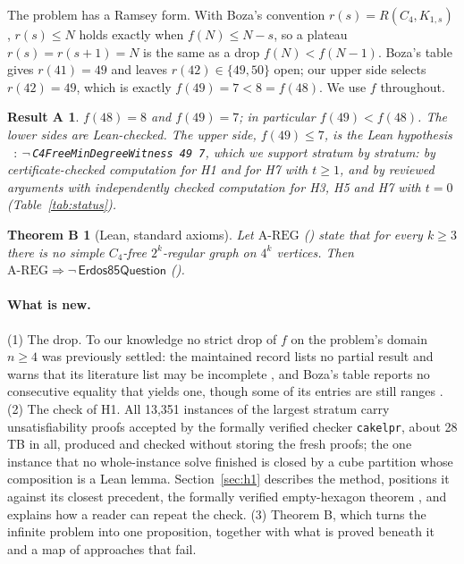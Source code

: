 \documentclass{anvil-paper}
\newcommand{\AREG}{\mathrm{A\text{-}REG}}
\newcommand{\Qn}{\textsf{Erdos85Question}}
\newcommand{\hnoFortyNine}{\lean{hno49}}
\newcommand{\cakelpr}{\texttt{cake\textunderscore lpr}}
\newtheorem*{resultA}{Result A}
\newtheorem*{theoremB}{Theorem B}
\theoremstyle{definition}
\begin{document}
The problem has a Ramsey form. With Boza's convention $r(s)=R(C_4,K_{1,s})$ \citep{boza2024ramsey,zhang2017polarity}, $r(s)\le N$ holds exactly when $f(N)\le N-s$, so a plateau $r(s)=r(s+1)=N$ is the same as a drop $f(N)<f(N-1)$. Boza's table gives $r(41)=49$ and leaves $r(42)\in\{49,50\}$ open; our upper side selects $r(42)=49$, which is exactly $f(49)=7<8=f(48)$. We use $f$ throughout.

\begin{resultA}
$f(48)=8$ and $f(49)=7$; in particular $f(49)<f(48)$. The lower sides are Lean-checked. The upper side, $f(49)\le 7$, is the Lean hypothesis \hnoFortyNine\ $:\ \neg\,$\texttt{C4FreeMinDegreeWitness 49 7}, which we support stratum by stratum: by certificate-checked computation for H1 and for H7 with $t\ge 1$, and by reviewed arguments with independently checked computation for H3, H5 and H7 with $t=0$ (Table~\ref{tab:status}).
\end{resultA}

\begin{theoremB}[Lean, standard axioms]
Let $\AREG$ () state that for every $k\ge 3$ there is no simple $C_4$-free $2^k$-regular graph on $4^k$ vertices. Then $\AREG\Rightarrow\neg\,\Qn$ ().
\end{theoremB}

\paragraph{What is new.} (1) The drop. To our knowledge no strict drop of $f$ on the problem's domain $n\ge 4$ was previously settled: the maintained record lists no partial result and warns that its literature list may be incomplete \citep{bloom-erdos85}, and Boza's table reports no consecutive equality that yields one, though some of its entries are still ranges \citep{boza2024ramsey}. (2) The check of H1. All 13,351 instances of the largest stratum carry unsatisfiability proofs accepted by the formally verified checker \cakelpr{}, about 28 TB in all, produced and checked without storing the fresh proofs; the one instance that no whole-instance solve finished is closed by a cube partition whose composition is a Lean lemma. Section~\ref{sec:h1} describes the method, positions it against its closest precedent, the formally verified empty-hexagon theorem \citep{heule2024hexagon,subercaseaux2024hexagonlean}, and explains how a reader can repeat the check. (3) Theorem B, which turns the infinite problem into one proposition, together with what is proved beneath it and a map of approaches that fail.
\end{document}
